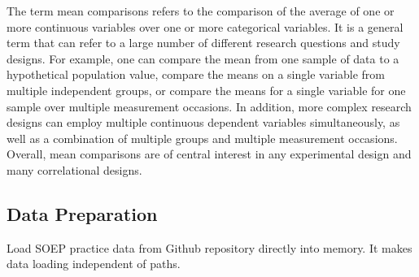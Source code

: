\documentclass[
]{book}
\newenvironment{Shaded}{\begin{snugshade}}{\end{snugshade}}
\newcommand{\DecValTok}[1]{\textcolor[rgb]{0.00,0.00,0.81}{#1}}
\newcommand{\DocumentationTok}[1]{\textcolor[rgb]{0.56,0.35,0.01}{\textbf{\textit{#1}}}}
\newcommand{\FunctionTok}[1]{\textcolor[rgb]{0.00,0.00,0.00}{#1}}
\newcommand{\NormalTok}[1]{#1}
\newcommand{\OtherTok}[1]{\textcolor[rgb]{0.56,0.35,0.01}{#1}}
\newcommand{\SpecialCharTok}[1]{\textcolor[rgb]{0.00,0.00,0.00}{#1}}
\newcommand{\StringTok}[1]{\textcolor[rgb]{0.31,0.60,0.02}{#1}}
\begin{document}
The term mean comparisons refers to the comparison of the average of one or more continuous variables over one or more categorical variables. It is a general term that can refer to a large number of different research questions and study designs. For example, one can compare the mean from one sample of data to a hypothetical population value, compare the means on a single variable from multiple independent groups, or compare the means for a single variable for one sample over multiple measurement occasions. In addition, more complex research designs can employ multiple continuous dependent variables simultaneously, as well as a combination of multiple groups and multiple measurement occasions. Overall, mean comparisons are of central interest in any experimental design and many correlational designs.

\hypertarget{data-preparation}{%
\subsection{Data Preparation}\label{data-preparation}}

Load SOEP practice data from Github repository directly into memory. It makes data loading independent of paths.

\begin{Shaded}
\end{Shaded}
\end{document}
